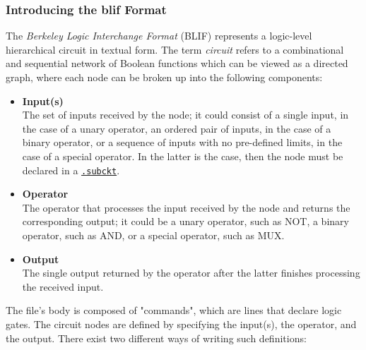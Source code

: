 \documentclass[]{usiinfbachelorproject}
\begin{document}
\subsubsection{Introducing the blif Format}\label{subsubsec:blif-format}
The \textit{Berkeley Logic Interchange Format} (BLIF) \cite{blif} represents a logic-level hierarchical circuit in textual form. The term \textit{circuit} refers to a combinational and sequential network of Boolean functions which can be viewed as a directed graph, where each node can be broken up into the following components:
\begin{itemize}
    \item \textbf{Input(s)}
        \vspace{0.2cm} \\
        The set of inputs received by the node; it could consist of a single input, in the case of a unary operator, an ordered pair of inputs, in the case of a binary operator, or a sequence of inputs with no pre-defined limits, in the case of a special operator. In the latter is the case, then the node must be declared in a \hyperref[it:gates]{\texttt{.subckt}}.
    \item \textbf{Operator}
        \vspace{0.2cm} \\
        The operator that processes the input received by the node and returns the corresponding output; it could be a unary operator, such as NOT, a binary operator, such as AND, or a special operator, such as MUX.
    \item \textbf{Output}
        \vspace{0.2cm} \\
        The single output returned by the operator after the latter finishes processing the received input.
\end{itemize}
The file's body is composed of "commands", which are lines that declare logic gates. The circuit nodes are defined by specifying the input(s), the operator, and the output. There exist two different ways of writing such definitions:
\end{document}
